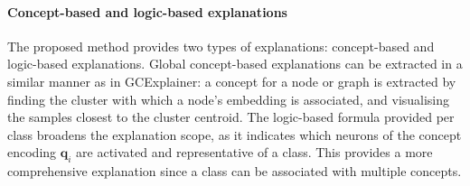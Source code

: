 
\paragraph{Concept-based and logic-based explanations}
The proposed method provides two types of explanations: concept-based and logic-based explanations. Global concept-based explanations can be extracted in a similar manner as in GCExplainer: a concept for a node or graph is extracted by finding the cluster with which a node's embedding is associated, and visualising the samples closest to the cluster centroid. The logic-based formula provided per class broadens the explanation scope, as it indicates which neurons of the concept encoding $\mathbf{q}_i$ are activated and representative of a class. This provides a more comprehensive explanation since a class can be associated with multiple concepts. 

